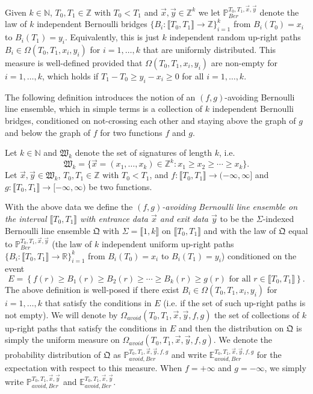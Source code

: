 Given $k \in \mathbb{N}$, $T_0, T_1 \in \mathbb{Z}$ with $T_0 < T_1$ and $\vec{x}, \vec{y} \in \mathbb{Z}^k$ we let $\mathbb{P}^{T_0,T_1, \vec{x},\vec{y}}_{Ber}$ denote the law of $k$ independent Bernoulli bridges $\{B_i: \llbracket T_0, T_1 \rrbracket  \rightarrow \mathbb{Z} \}_{i = 1}^k$ from $B_i(T_0) = x_i$ to $B_i(T_1) = y_i$. Equivalently, this is just $k$ independent random up-right paths $B_i \in \Omega(T_0,T_1,x_i,y_i)$ for $i = 1, \dots, k$ that are uniformly distributed. This measure is well-defined provided that $\Omega(T_0,T_1,x_i,y_i)$ are non-empty for $i = 1, \dots, k$, which holds if $T_1 - T_0 \geq y_i - x_i \geq 0$ for all $i = 1, \dots, k$. 



The following definition introduces the notion of an $(f,g)$-avoiding Bernoulli line ensemble, which in simple terms is a collection of $k$ independent Bernoulli bridges, conditioned on not-crossing each other and staying above the graph of $g$ and below the graph of $f$ for two functions $f$ and $g$.
\begin{definition}\label{DefAvoidingLawBer}
Let $k \in \mathbb{N}$ and $\mathfrak{W}_k$ denote the set of signatures of length $k$, i.e.
$$\mathfrak{W}_k = \{ \vec{x} = (x_1, \dots, x_k) \in \mathbb{Z}^k: x_1 \geq  x_2 \geq  \cdots \geq  x_k \}.$$
Let $\vec{x}, \vec{y} \in \mathfrak{W}_k$, $T_0, T_1 \in \mathbb{Z}$ with $T_0 < T_1$, and $f: \llbracket T_0, T_1 \rrbracket \rightarrow (-\infty, \infty]$ and $g: \llbracket T_0, T_1 \rrbracket \rightarrow [-\infty, \infty)$ be two functions. 

With the above data we define the {\em $(f,g)$-avoiding Bernoulli line ensemble on the interval $\llbracket T_0, T_1 \rrbracket$ with entrance data $\vec{x}$ and exit data $\vec{y}$} to be the $\Sigma$-indexed Bernoulli line ensemble $\mathfrak{Q}$ with $\Sigma = \llbracket 1, k\rrbracket$ on $\llbracket T_0, T_1 \rrbracket$ and with the law of $\mathfrak{Q}$ equal to $\mathbb{P}^{T_0,T_1, \vec{x},\vec{y}}_{Ber}$ (the law of $k$ independent uniform up-right paths $\{B_i: \llbracket T_0, T_1 \rrbracket \rightarrow \mathbb{R} \}_{i = 1}^k$ from $B_i(T_0) = x_i$ to $B_i(T_1) = y_i$) conditioned on the event 
$$E  = \left\{ f(r) \geq B_1(r) \geq B_2(r) \geq \cdots \geq B_k(r) \geq g(r) \mbox{ for all $r \in \llbracket T_0, T_1 \rrbracket$} \right\}.$$ 
The above definition is well-posed if there exist $B_i \in \Omega(T_0,T_1,x_i,y_i)$ for $i = 1, \dots, k$ that satisfy the conditions in $E$ (i.e. if the set of such up-right paths is not empty). We will denote by $\Omega_{avoid}(T_0, T_1, \vec{x}, \vec{y}, f,g)$ the set of collections of $k$ up-right paths that satisfy the conditions in $E$ and then the distribution on $\mathfrak{Q}$ is simply the uniform measure on $\Omega_{avoid}(T_0, T_1, \vec{x}, \vec{y}, f,g)$. We denote the probability distribution of $\mathfrak{Q}$ as $\mathbb{P}_{avoid, Ber}^{T_0,T_1, \vec{x}, \vec{y}, f, g}$ and write $\mathbb{E}_{avoid, Ber}^{T_0, T_1, \vec{x}, \vec{y}, f, g}$ for the expectation with respect to this measure. When $f=+\infty$ and $g=-\infty$, we simply write $\mathbb{P}^{T_0, T_1, \vec{x},\vec{y}}_{avoid, Ber}$ and $\mathbb{E}^{T_0, T_1, \vec{x},\vec{y}}_{avoid, Ber}$.
\end{definition}

